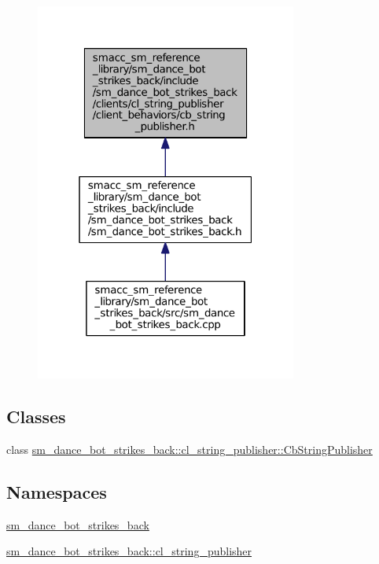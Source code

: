 \begin{figure}[H]
\begin{center}
\leavevmode
\includegraphics[width=244pt]{strikes__back_2include_2sm__dance__bot__strikes__back_2clients_2cl__string__publisher_2client__b8a29aacdbda40677e8b012a23c789575}
\end{center}
\end{figure}
\subsection*{Classes}
\begin{DoxyCompactItemize}
\item 
class \hyperlink{classsm__dance__bot__strikes__back_1_1cl__string__publisher_1_1CbStringPublisher}{sm\+\_\+dance\+\_\+bot\+\_\+strikes\+\_\+back\+::cl\+\_\+string\+\_\+publisher\+::\+Cb\+String\+Publisher}
\end{DoxyCompactItemize}
\subsection*{Namespaces}
\begin{DoxyCompactItemize}
\item 
 \hyperlink{namespacesm__dance__bot__strikes__back}{sm\+\_\+dance\+\_\+bot\+\_\+strikes\+\_\+back}
\item 
 \hyperlink{namespacesm__dance__bot__strikes__back_1_1cl__string__publisher}{sm\+\_\+dance\+\_\+bot\+\_\+strikes\+\_\+back\+::cl\+\_\+string\+\_\+publisher}
\end{DoxyCompactItemize}
